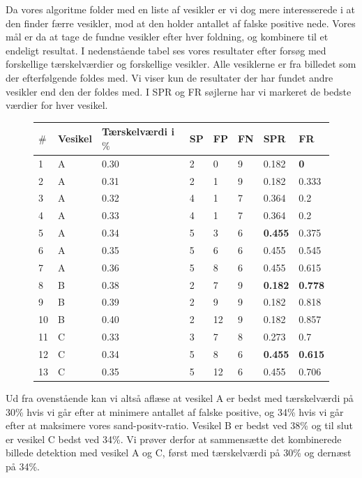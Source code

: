 Da vores algoritme folder med en liste af vesikler er vi dog mere interesserede i at den finder færre vesikler, mod at den holder antallet af falske positive nede. Vores mål er da at tage de fundne vesikler efter hver foldning, og kombinere til et endeligt resultat. I nedenstående tabel ses vores resultater efter forsøg med forskellige tærskelværdier og forskellige  vesikler. Alle vesiklerne er fra billedet som der efterfølgende foldes med. Vi viser kun de resultater der har fundet andre vesikler end den der foldes med. I SPR og FR søjlerne har vi markeret de bedste værdier for hver vesikel.
\begin{figure}[H]
	\centering
\begin{tabular}{l|l|l|l|l|l|l|l}
	$\#$ & Vesikel & Tærskelværdi i $\%$ & SP & FP & FN & SPR & FR \\\hline
	1	&	A	&	0.30	& 2		& 0		&9 	&0.182 			&\textbf{0}\\\hline
	2	&	A	&	0.31	& 2		& 1		&9 	&0.182 			&0.333\\\hline
	3	&	A	&	0.32	& 4		& 1		&7  &0.364 			&0.2\\\hline
	4	&	A	&	0.33	& 4		& 1		&7  &0.364 			&0.2\\\hline
	5	&	A	&	0.34	& 5		& 3		&6  &\textbf{0.455}	&0.375\\\hline
	6	&	A	&	0.35	& 5		& 6		&6  &0.455 			&0.545\\\hline
	7	&	A	&	0.36	& 5		& 8		&6  &0.455			&0.615\\\hline	
	8	&	B	&	0.38	& 2		& 7		&9 	&\textbf{0.182}	&\textbf{0.778}\\\hline
	9	&	B	&	0.39	& 2		& 9		&9 	&0.182 			&0.818\\\hline
	10	&	B	&	0.40	& 2		& 12	&9 	&0.182 			&0.857\\\hline	
	11	&	C	&	0.33	& 3		& 7		&8 	&0.273 			&0.7\\\hline
	12	&	C	&	0.34	& 5		& 8		&6 	&\textbf{0.455}	&\textbf{0.615}\\\hline
	13	&	C	&	0.35	& 5		& 12	&6 	&0.455 			&0.706
\end{tabular} 
\end{figure}

Ud fra ovenstående kan vi altså aflæse at vesikel A er bedst med tærskelværdi på 30\% hvis vi går efter at minimere antallet af falske positive, og 34\% hvis vi går efter at maksimere vores sand-positv-ratio. Vesikel B er bedst ved 38\% og til slut er vesikel C bedst ved 34\%. Vi prøver derfor at sammensætte det kombinerede billede detektion med vesikel A og C, først med tærskelværdi på 30\% og dernæst på 34\%. 

